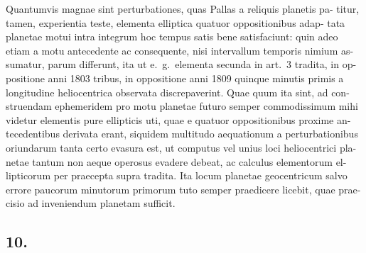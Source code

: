 \documentclass[12pt,a4paper]{article}
\begin{document}
Quantumvis magnae sint perturbationes, quas Pallas a reliquis planetis pa-
titur, tamen, experientia teste, elementa elliptica quatuor oppositionibus adap-
tata planetae motui intra integrum hoc tempus satis bene satisfaciunt: quin adeo
etiam a motu antecedente ac consequente, nisi intervallum temporis nimium as-
sumatur, parum differunt, ita ut e.\ g.\ elementa secunda in art.\ 3 tradita, in op-
positione anni 1803 tribus, in oppositione anni 1809 quinque minutis primis a
longitudine heliocentrica observata discrepaverint. Quae quum ita sint, ad con-
struendam ephemeridem pro motu planetae futuro semper commodissimum mihi
videtur elementis pure ellipticis uti, quae e quatuor oppositionibus proxime an-
tecedentibus derivata erant, siquidem multitudo aequationum a perturbationibus
oriundarum tanta certo evasura est, ut computus vel unius loci heliocentrici pla-
netae tantum non aeque operosus evadere debeat, ac calculus elementorum el-
lipticorum per praecepta supra tradita. Ita locum planetae geocentricum salvo
errore paucorum minutorum primorum tuto semper praedicere licebit, quae prae-
cisio ad inveniendum planetam sufficit.

\subsection*{10.}
\end{document}
